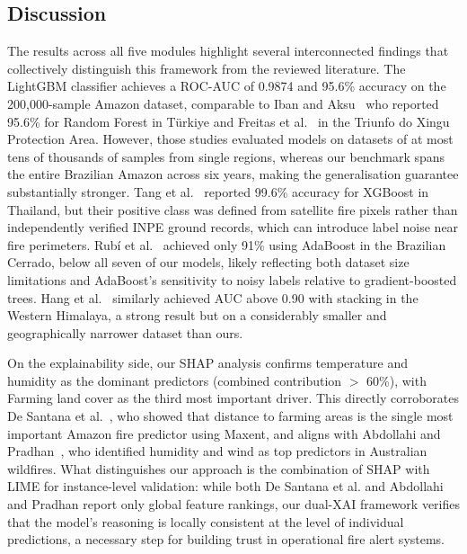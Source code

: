\documentclass[12pt,a4paper]{article}
\begin{document}
\subsection{Discussion}

The results across all five modules highlight several interconnected findings that collectively distinguish this framework from the reviewed literature. The LightGBM classifier achieves a ROC-AUC of 0.9874 and 95.6\% accuracy on the 200,000-sample Amazon dataset, comparable to Iban and Aksu~\cite{iban2024} who reported 95.6\% for Random Forest in T\"{u}rkiye and Freitas et al.~\cite{freitas2024} in the Triunfo do Xingu Protection Area. However, those studies evaluated models on datasets of at most tens of thousands of samples from single regions, whereas our benchmark spans the entire Brazilian Amazon across six years, making the generalisation guarantee substantially stronger. Tang et al.~\cite{tang2024} reported 99.6\% accuracy for XGBoost in Thailand, but their positive class was defined from satellite fire pixels rather than independently verified INPE ground records, which can introduce label noise near fire perimeters. Rub\'{i} et al.~\cite{rubi2023} achieved only 91\% using AdaBoost in the Brazilian Cerrado, below all seven of our models, likely reflecting both dataset size limitations and AdaBoost's sensitivity to noisy labels relative to gradient-boosted trees. Hang et al.~\cite{hang2024} similarly achieved AUC above 0.90 with stacking in the Western Himalaya, a strong result but on a considerably smaller and geographically narrower dataset than ours.

On the explainability side, our SHAP analysis confirms temperature and humidity as the dominant predictors (combined contribution $>$ 60\%), with Farming land cover as the third most important driver. This directly corroborates De Santana et al.~\cite{desantana2024}, who showed that distance to farming areas is the single most important Amazon fire predictor using Maxent, and aligns with Abdollahi and Pradhan~\cite{abdollahi2023}, who identified humidity and wind as top predictors in Australian wildfires. What distinguishes our approach is the combination of SHAP with LIME for instance-level validation: while both De Santana et al. and Abdollahi and Pradhan report only global feature rankings, our dual-XAI framework verifies that the model's reasoning is locally consistent at the level of individual predictions, a necessary step for building trust in operational fire alert systems.
\end{document}
